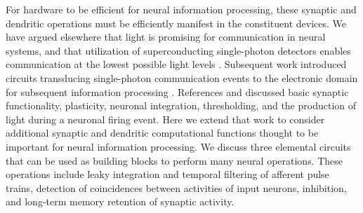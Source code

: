 \documentclass[twocolumn]{article}
\begin{document}
For hardware to be efficient for neural information processing, these synaptic and dendritic operations must be efficiently manifest in the constituent devices. We have argued elsewhere that light is promising for communication in neural systems, and that utilization of superconducting single-photon detectors enables communication at the lowest possible light levels \cite{shbu2017}. Subsequent work introduced circuits transducing single-photon communication events to the electronic domain for subsequent information processing \cite{sh2018,sh2018_full}. References \cite{sh2018} and \cite{sh2018_full} discussed basic synaptic functionality, plasticity, neuronal integration, thresholding, and the production of light during a neuronal firing event. Here we extend that work to consider additional synaptic and dendritic computational functions thought to be important for neural information processing. We discuss three elemental circuits that can be used as building blocks to perform many neural operations. These operations include leaky integration and temporal filtering of afferent pulse trains, detection of coincidences between activities of input neurons, inhibition, and long-term memory retention of synaptic activity.
\end{document}
